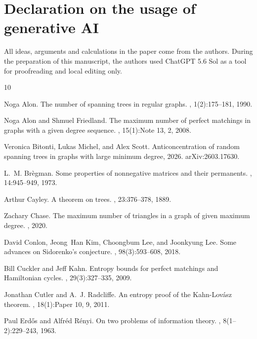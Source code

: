 \documentclass[reqno,final,a4paper]{amsart}
\numberwithin{equation}{section}
\theoremstyle{definition}
\theoremstyle{remark}
\begin{document}
\section*{Declaration on the usage of generative AI}
All ideas, arguments and calculations in the paper come from the authors. During the preparation of this manuscript, the authors used ChatGPT 5.6 Sol as a tool for proofreading and local editing only.

\begin{thebibliography}{10}

Noga Alon.
\newblock The number of spanning trees in regular graphs.
, 1(2):175--181, 1990.

Noga Alon and Shmuel Friedland.
\newblock The maximum number of perfect matchings in graphs with a given degree sequence.
, 15(1):Note 13, 2, 2008.

Veronica Bitonti, Lukas Michel, and Alex Scott.
\newblock Anticoncentration of random spanning trees in graphs with large minimum degree, 2026.
\newblock arXiv:2603.17630.

L.~M. Br{\`e}gman.
\newblock Some properties of nonnegative matrices and their permanents.
, 14:945--949, 1973.

Arthur Cayley.
\newblock A theorem on trees.
, 23:376--378, 1889.

Zachary Chase.
\newblock The maximum number of triangles in a graph of given maximum degree.
, 2020.

David Conlon, Jeong~Han Kim, Choongbum Lee, and Joonkyung Lee.
\newblock Some advances on {S}idorenko's conjecture.
, 98(3):593--608, 2018.

Bill Cuckler and Jeff Kahn.
\newblock Entropy bounds for perfect matchings and {H}amiltonian cycles.
, 29(3):327--335, 2009.

Jonathan Cutler and A.~J. Radcliffe.
\newblock An entropy proof of the {K}ahn-{L}ov\'{a}sz theorem.
, 18(1):Paper 10, 9, 2011.

Paul Erd{\H{o}}s and Alfr{\'e}d R{\'e}nyi.
\newblock On two problems of information theory.
, 8(1--2):229--243, 1963.


\end{thebibliography}
\end{document}
